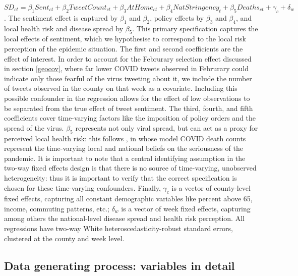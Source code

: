 \documentclass{article}
\begin{document}
\begin{equation}
  SD_{ct} = \beta_1 Sent_{ct} + \beta_2 TweetCount_{ct} + \beta_3 AtHome_{ct} + \beta_4 NatStringency_{t} + \beta_5 Deaths_{ct} + \gamma_c + \delta_w
\end{equation}. The sentiment effect is captured by \(\beta_1\) and \(\beta_2\), policy effects by \(\beta_3\) and \(\beta_4\), and local health risk and disease spread by \(\beta_5\). This primary specification captures the local effects of sentiment, which we hypothesise to correspond to the local risk perception of the epidemic situation. The first and second coefficients are the effect of interest. In order to account for the Februrary selection effect discussed in section \ref{geocov}, where far lower COVID tweets observed in Februrary could indicate only those fearful of the virus tweeting about it, we include the number of tweets observed in the county on that week as a covariate. Including this possible confounder in the regression allows for the effect of low observations to be separated from the true effect of tweet sentiment. The third, fourth, and fifth coefficients cover time-varying factors like the imposition of policy orders and the spread of the virus. \(\beta_5\) represents not only viral spread, but can act as a proxy for perceived local health risk: this follows \textcite{chernozhukovCausalImpactMasks2021}, in whose model COVID death counts represent the time-varying local and national beliefs on the seriousness of the pandemic. It is important to note that a central identifying assumption in the two-way fixed effects design is that there is no source of time-varying, unobserved heterogeneity: thus it is important to verify that the correct specification is chosen for these time-varying confounders. Finally, \(\gamma_c\) is a vector of county-level fixed effects, capturing all constant demographic variables like percent above 65, income, commuting patterns, etc.; \(\delta_w\) is a vector of week fixed effects, capturing among others the national-level disease spread and health risk perception. All regressions have two-way White heteroscedasticity-robust standard errors, clustered at the county and week level.






\subsection{Data generating process: variables in detail}
\end{document}
